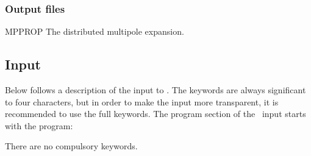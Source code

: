 \subsubsection{Output files}

\begin{filelist}
\item[MPPROP]
The distributed multipole expansion.
\end{filelist}

\subsection{Input}
\label{UG:sec:mpprop_input}

Below follows a description of the input to . The keywords
are always significant to four characters, but in order to make the
input more transparent, it is recommended to use the full keywords.
The  program section of the \molcas\ input starts with the
program:


There are no compulsory keywords.

